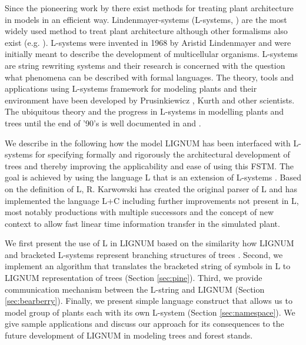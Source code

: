 Since the pioneering work  by \citet{honda:71} there exist methods for
treating   plant  architecture   in  models   in  an   efficient  way.
Lindenmayer-systems  (L-systems, \citet{pp:89})  are  the most  widely
used method to treat plant architecture although other formalisms also
exist (e.g.  \citet{dereffye:97, godin:99} ).  L-systems were invented
in 1968 by  Aristid Lindenmayer \citep{lindenmayer:68, lindenmayer:71}
and were initially meant  to describe the development of multicellular
organisms.  L-systems are string  rewriting systems and their research
is concerned  with the question  what phenomena can be  described with
formal languages.  The theory,  tools and applications using L-systems
framework  for  modeling  plants   and  their  environment  have  been
developed by Prusinkiewicz \citep{pp:89,pp:92}, Kurth \citep{kurth:94}
and  other scientists.   The  ubiquitous theory  and  the progress  in
L-systems in modelling plants and trees until the end of '90's is well
documented in \citet{pp:90,pp:99} and \citet{kurth:99}.

We describe in the following  how the model LIGNUM has been interfaced
with   L-systems   for   specifying   formally  and   rigorously   the
architectural   development  of  trees   and  thereby   improving  the
applicability and  ease of using this  FSTM.  The goal  is achieved by
using the language L that  is an extension of L-systems \citep{pp:99a}.
Based on the definition of  L, R.  Karwowski has created the original
parser of L and  has implemented the language L+C \citep{karwowski:02}
including  further  improvements  not   present  in  L,  most  notably
productions with multiple successors and the concept of new context
\citep{karwowski:03} to allow fast linear time information transfer in
the simulated plant.

We first  present the use of L  in LIGNUM based on  the similarity how
LIGNUM and bracketed L-systems represent branching structures of trees
\citep{perttunen:96, perttunen:01}.  Second,  we implement an algorithm
that  translates  the bracketed  string  of  symbols  in L  to  LIGNUM
representation of  trees (Section \ref{sec:pine}).   Third, we provide
communication mechanism between the L-string and LIGNUM (Section
\ref{sec:bearberry}).  Finally,  we present simple  language construct
that allows  us to model  group of plants  each with its  own L-system
(Section  \ref{sec:namespace}).   We   give  sample  applications  and
discuss our approach for its consequences to the future development of
LIGNUM in modeling trees and forest stands.

